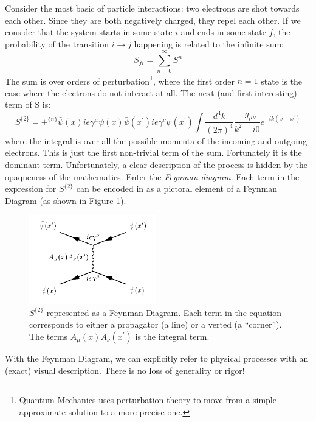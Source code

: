 Consider the most basic of particle interactions: two electrons are shot towards each other. Since they are both negatively charged, they repel each other. If we consider that the system starts in some state $i$ and ends in some state $f$, the probability of the transition $i\rightarrow j$ happening is related to the infinite sum:
\begin{equation}
    S_{fi} = \sum_{n=0}^{\infty}S^n
\end{equation}
The sum is over orders of perturbation\footnote{Quantum Mechanics uses perturbation theory to move from a simple approximate solution to a more precise one.}, where the first order $n=1$ state is the case where the electrons do not interact at all. The next (and first interesting) term of S is:
\begin{equation}
    S^{\{2\}} = \pm^{\{n\}}\bar\psi(x)ie\gamma^\mu\psi(x)\bar\psi(x^\prime)ie\gamma^\nu\psi(x^\prime)\int\frac{d^4k}{(2\pi)^4}\frac{-g_{\mu\nu}}{k^2-i0}e^{-ik(x-x^\prime)}
\end{equation}
where the integral is over all the possible momenta of the incoming and outgoing electrons. This is just the first non-trivial term of the sum. Fortunately it is the dominant term. Unfortunately, a clear description of the process is hidden by the opaqueness of the mathematics. Enter the \textit{Feynman diagram}. Each term in the expression for $S^{\{2\}}$ can be encoded in as a pictoral element of a Feynman Diagram (as shown in Figure \ref{Fig:Intro:Feynman0}). 
\begin{figure}[h]
    \centering
        \includegraphics[width=0.49\textwidth]{F1/Fee}
        \caption{$S^{\{2\}}$ represented as a Feynman Diagram. Each term in the equation corresponds to either a propagator (a line) or a verted (a ``corner''). The terms \underline{$A_\mu(x)A_\nu(x^\prime)$} is the integral term.}
        \label{Fig:Intro:Feynman0}
\end{figure}
With the Feynman Diagram, we can explicitly refer to physical processes with an (exact) visual description. There is no loss of generality or rigor!

